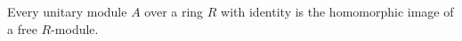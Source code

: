 Every unitary module $A$ over a ring $R$ with identity is the homomorphic image of a free $R$-module.
